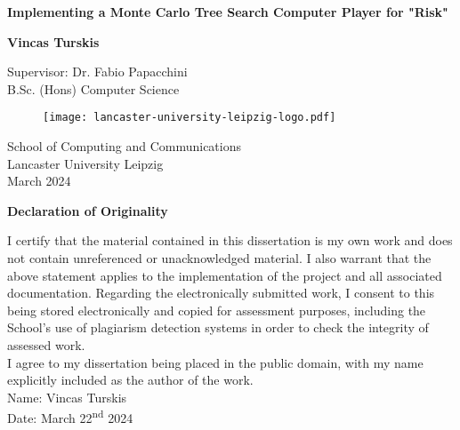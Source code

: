 \documentclass[12pt,a4paper]{report}
\begin{document}
\noindent

\vspace*{4.5cm}

\centering
\huge
\textbf{Implementing a Monte Carlo Tree Search Computer Player for "Risk"}\\
\vspace*{1cm}
\Large

\textbf{Vincas Turskis}\\
\vspace*{0.4cm}


\vspace*{5cm}

\large
Supervisor: Dr. Fabio Papacchini \\
\vspace*{0.25cm}
B.Sc. (Hons) Computer Science \\
\vspace*{1.2cm}
\begin{figure}[H]
\centering
\texttt{[image: lancaster-university-leipzig-logo.pdf]}
\end{figure}
\vspace*{1.2cm}
School of Computing and Communications \\
\vspace*{0.25cm}
Lancaster University Leipzig \\ 
\vspace*{0.25cm}
March 2024\\
\newpage

\centering
\Large
\textbf{Declaration of Originality}\\
\vspace*{1cm}
\normalsize

\begin{minipage}[c]{0.7\linewidth}
I certify that the material contained in this dissertation is my own work and does not contain
unreferenced or unacknowledged material. I also warrant that the above statement applies to the
implementation of the project and all associated documentation. Regarding the electronically
submitted work, I consent to this being stored electronically and copied for assessment purposes,
including the School's use of plagiarism detection systems in order to check the integrity of
assessed work.\\

I agree to my dissertation being placed in the public domain, with my name explicitly included
as the author of the work.\\

Name: Vincas Turskis\\ 
Date: March 22\textsuperscript{nd} 2024
\end{minipage}
\newpage
\end{document}
